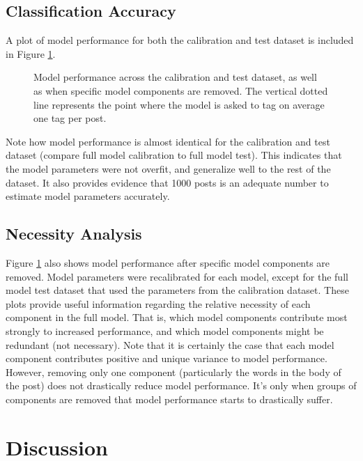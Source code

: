 \documentclass[10pt,letterpaper]{article}
\begin{document}
\subsection{Classification Accuracy}

A plot of model performance for both the calibration and test dataset is included in Figure \ref{fig:ROC}.

\begin{figure}[ht]
  \centering
  \caption{
    Model performance across the calibration and test dataset, as well as when specific model components are removed.
    The vertical dotted line represents the point where the model is asked to tag on average one tag per post.
  }
  \label{fig:ROC}
\end{figure}

Note how model performance is almost identical for the calibration and test dataset (compare full model calibration to full model test).
This indicates that the model parameters were not overfit, and generalize well to the rest of the dataset.
It also provides evidence that \num{1000} posts is an adequate number to estimate model parameters accurately.

\subsection{Necessity Analysis}

Figure \ref{fig:ROC} also shows model performance after specific model components are removed.
Model parameters were recalibrated for each model, except for the full model test dataset that used the parameters from the calibration dataset.
These plots provide useful information regarding the relative necessity of each component in the full model.
That is, which model components contribute most strongly to increased performance, and which model components might be redundant (not necessary).
Note that it is certainly the case that each model component contributes positive and unique variance to model performance.
However, removing only one component (particularly the words in the body of the post) does not drastically reduce model performance.
It's only when groups of components are removed that model performance starts to drastically suffer.

\section{Discussion}
\end{document}
